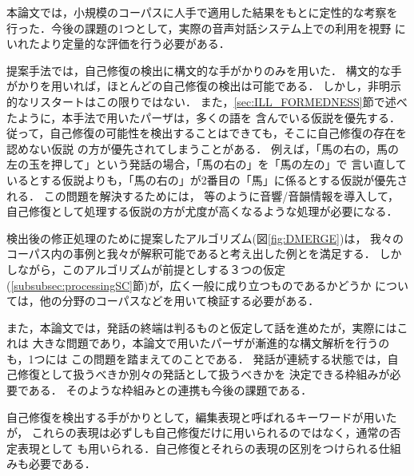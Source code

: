 本論文では，小規模のコーパスに人手で適用した結果をもとに定性的な考察を
行った．今後の課題の1つとして，実際の音声対話システム上での利用を視野
にいれたより定量的な評価を行う必要がある．

提案手法では，自己修復の検出に構文的な手がかりのみを用いた．
構文的な手がかりを用いれば，ほとんどの自己修復の検出は可能である．
しかし，非明示的なリスタートはこの限りではない．
また，\ref{sec:ILL_FORMEDNESS}節で述べたように，本手法で用いたパーザは，多くの語を
含んでいる仮説を優先する．
従って，自己修復の可能性を検出することはできても，そこに自己修復の存在を認めない仮説
の方が優先されてしまうことがある．
例えば，「馬の右の，馬の左の玉を押して」という発話の場合，「馬の右の」を「馬の左の」で
言い直しているとする仮説よりも，「馬の右の」が2番目の「馬」に係るとする仮説が優先される．
この問題を解決するためには，\cite{BJ1992,OD1992,NC1993,HP1997,SJ2000}
等のように音響/音韻情報を導入して，
自己修復として処理する仮説の方が尤度が高くなるような処理が必要になる．

検出後の修正処理のために提案したアルゴリズム(図\ref{fig:DMERGE})は，
我々のコーパス内の事例と我々が解釈可能であると考え出した例とを満足する．
しかしながら，このアルゴリズムが前提としする３つの仮定
(\ref{subsubsec:processingSC}節)が，広く一般に成り立つものであるかどうか
については，他の分野のコーパスなどを用いて検証する必要がある．

また，本論文では，発話の終端は判るものと仮定して話を進めたが，実際にはこれは
大きな問題であり，本論文で用いたパーザが漸進的な構文解析を行うのも，1つには
この問題を踏まえてのことである．
発話が連続する状態では，自己修復として扱うべきか別々の発話として扱うべきかを
決定できる枠組みが必要である．
そのような枠組みとの連携も今後の課題である．

自己修復を検出する手がかりとして，編集表現と呼ばれるキーワードが用いたが，
これらの表現は必ずしも自己修復だけに用いられるのではなく，通常の否定表現として
も用いられる．自己修復とそれらの表現の区別をつけられる仕組みも必要である．









